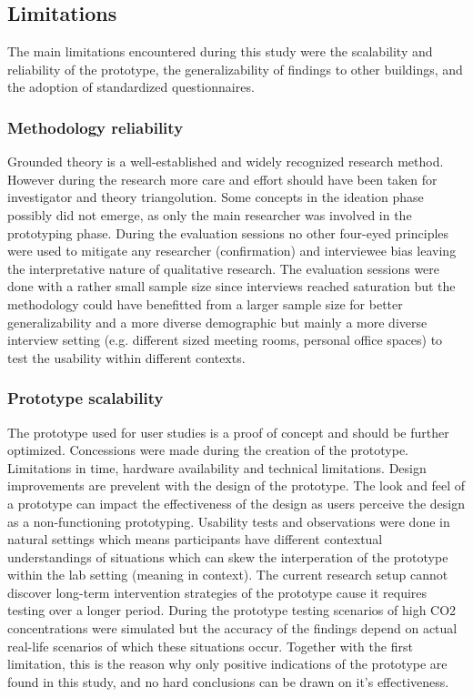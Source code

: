 \subsection{Limitations}

The main limitations encountered during this study were the scalability and reliability of the prototype, the generalizability of findings to other buildings, and the adoption of standardized questionnaires.

\subsubsection{Methodology reliability}

Grounded theory is a well-established and widely recognized research method. However during the research more care and effort should have been taken for investigator and theory triangolution. Some concepts in the ideation phase possibly did not emerge, as only the main researcher was involved in the prototyping phase. During the evaluation sessions  no other four-eyed principles were used to mitigate any researcher (confirmation) and interviewee bias leaving the interpretative nature of qualitative research. The evaluation sessions were done with a rather small sample size since interviews reached saturation but the methodology could have benefitted from a larger sample size for better generalizability and a more diverse demographic but mainly a more diverse interview setting (e.g. different sized meeting rooms, personal office spaces) to test the usability within different contexts.

\subsubsection{Prototype scalability}
The prototype used for user studies is a proof of concept and should be further optimized. Concessions were made during the creation of the prototype. Limitations in time, hardware availability and technical limitations. Design improvements are prevelent with the design of the prototype. The look and feel of a prototype can impact the effectiveness of the design as users perceive the design as a non-functioning prototyping. Usability tests and observations were done in natural settings which means participants have different contextual understandings of situations which can skew the interperation of the prototype within the lab setting (meaning in context). The current research setup cannot discover long-term intervention strategies of the prototype cause it requires testing over a longer period. During the prototype testing scenarios of high CO2 concentrations were simulated but the accuracy of the findings depend on actual real-life scenarios of which these situations occur. Together with the first limitation, this is the reason why only positive indications of the prototype are found in this study, and no hard conclusions can be drawn on it's effectiveness.

